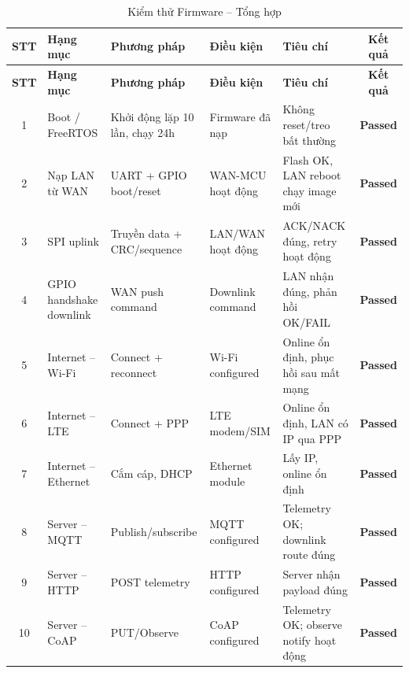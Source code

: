         \begin{longtable}{|c|p{2.5cm}|p{3.5cm}|p{2cm}|p{4cm}|c|}
            \caption{Kiểm thử Firmware -- Tổng hợp}
            \label{tab:test_firmware_summary} \\
            \hline
            \textbf{STT} & \textbf{Hạng mục} & \textbf{Phương pháp} & \textbf{Điều kiện} & \textbf{Tiêu chí} & \textbf{Kết quả} \\ \hline
            \endfirsthead
            \hline
            \textbf{STT} & \textbf{Hạng mục} & \textbf{Phương pháp} & \textbf{Điều kiện} & \textbf{Tiêu chí} & \textbf{Kết quả} \\ \hline
            \endhead
            \hline
            \endfoot
            \endlastfoot
        
            1 & Boot / FreeRTOS & Khởi động lặp 10 lần, chạy 24h & Firmware đã nạp & Không reset/treo bất thường & \textcolor{modern_blue}{\textbf{Passed}} \\ \hline
            2 & Nạp LAN từ WAN & UART + GPIO boot/reset & WAN-MCU hoạt động & Flash OK, LAN reboot chạy image mới & \textcolor{modern_blue}{\textbf{Passed}} \\ \hline
            3 & SPI uplink & Truyền data + CRC/sequence & LAN/WAN hoạt động & ACK/NACK đúng, retry hoạt động & \textcolor{modern_blue}{\textbf{Passed}} \\ \hline
            4 & GPIO handshake downlink & WAN push command & Downlink command & LAN nhận đúng, phản hồi OK/FAIL & \textcolor{modern_blue}{\textbf{Passed}} \\ \hline
            5 & Internet -- Wi-Fi & Connect + reconnect & Wi-Fi configured & Online ổn định, phục hồi sau mất mạng & \textcolor{modern_blue}{\textbf{Passed}} \\ \hline
            6 & Internet -- LTE & Connect + PPP & LTE modem/SIM & Online ổn định, LAN có IP qua PPP & \textcolor{modern_blue}{\textbf{Passed}} \\ \hline
            7 & Internet -- Ethernet & Cắm cáp, DHCP & Ethernet module & Lấy IP, online ổn định & \textcolor{modern_blue}{\textbf{Passed}} \\ \hline
            8 & Server -- MQTT & Publish/subscribe & MQTT configured & Telemetry OK; downlink route đúng & \textcolor{modern_blue}{\textbf{Passed}} \\ \hline
            9 & Server -- HTTP & POST telemetry & HTTP configured & Server nhận payload đúng & \textcolor{modern_blue}{\textbf{Passed}} \\ \hline
            10 & Server -- CoAP & PUT/Observe & CoAP configured & Telemetry OK; observe notify hoạt động & \textcolor{modern_blue}{\textbf{Passed}} \\ \hline

\end{longtable}
